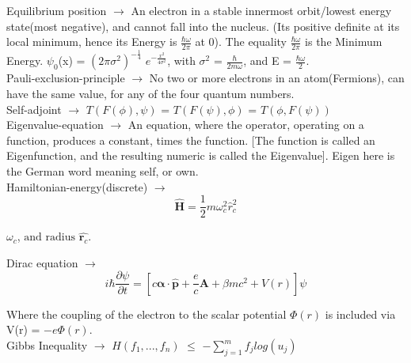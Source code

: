 \documentclass[a4paper, 10pt, onepage]{elegantbook}
\begin{document}
{Equilibrium position $\longrightarrow$ An electron in a stable innermost orbit/lowest energy state(most negative), and cannot fall into the nucleus.
(Its positive definite at its local minimum, hence its Energy is $\frac{\hbar \omega}{2 \pi}$ at 0). The equality $\frac{\hbar \omega}{2 \pi}$ is the Minimum Energy. $\psi_0$(x) = $(2 \pi \sigma^2)^{- \frac{1}{4}}$ $e^{- \frac{x^2}{4 \sigma^2}}$, with $\sigma^2$ = $\frac{\hbar}{2m \omega}$, and E = $\frac{\hbar \omega}{2}$. \\
 
Pauli-exclusion-principle $\longrightarrow$ No two or more electrons in an atom(Fermions), can have the same value, for any of the four quantum numbers. \\
 
Self-adjoint $\longrightarrow$ $T(F(\phi), \psi)$ = $T(F(\psi), \phi)$ = $T(\phi, F(\psi))$  \\
 
Eigenvalue-equation $\longrightarrow$ An equation, where the operator, operating on a function, produces a constant, times the function. [The function is called 
an Eigenfunction, and the resulting numeric is called the Eigenvalue]. Eigen here is the German word meaning self, or own.  \\
               
Hamiltonian-energy(discrete)   $\longrightarrow$
\begin{equation}
\hat {\mathbf H} = \frac{1}{2} m \omega^2_c \hat {r}^2_c
\end{equation}

 $\omega_c$, $\text{and radius}$ $\hat {\mathbf {r}_c}$.

Dirac equation $\longrightarrow$
\begin{equation}
i \hbar \frac{\partial \psi}{\partial t} =  \left[ c {\mathbf \alpha} \cdot \hat {\mathbf p} + \frac{e}{c} {\mathbf A} + {\beta m} {c^2} + V(r) \right] \psi
\end{equation}

Where the coupling of the electron to the scalar potential $\Phi(r)$ is included via V(r) = ${- e \Phi(r)}$.  \\

Gibbs Inequality $\longrightarrow$ $H(f_1,...,f_n)$ $\leq$ ${- \sum_{j=1}^{m} f_j log(u_j)}$ \\
 
}
\end{document}
